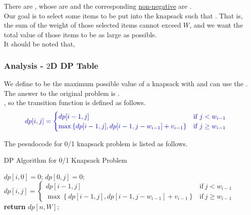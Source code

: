 There are {\color{blue}{$n$ items}}, whose {\color{blue}{weights}} are {} and the corresponding \ul{non-negative} {\color{blue}{values}} are {}. \\

Our goal is to select some items to be put into the knapsack such that {\color{blue}{the total value of those items is maximized}}. That is, the sum of the weight of those selected items cannot exceed $W$, and we want the total value of those items to be as large as possible.\\

It should be noted that, {\color{blue}{in the 0/1 knapsack problem, each item can only be used once.}}

\subsubsection{Analysis - $2$D DP Table}
We define {\color{blue}{$ dp[i, j] $}} to be the maximum possible value of a knapsack with {\color{blue}{capacity $ j $}} and can use the {\color{blue}{first $ i $ items}}. \\

The answer to the original problem is {\color{blue}{$ dp[n, W] $}}.\\

{\color{ForestGreen}{For each item $i$, we can choose to either put it into the knapsack or not}}, so the transition function is defined as follows.
\begin{equation}
{\color{blue}{
dp[i, j] = 
\begin{cases} 
    dp[i - 1, j] & \text{if}\ j < w_{i-1}\\
    \max\left\{dp[i - 1, j], dp[i - 1, j - w_{i-1}] + v_{i-1}\right\} & \text{if}\ j \geq w_{i-1}
\end{cases}
}}
\end{equation}

The pesudocode for 0/1 knapsack problem is listed as follows.
\begin{algorithm}[H]\label{algorithm:01_knapsack_problem_1}
\caption{DP Algorithm for 0/1 Knapsack Problem}
\begin{algorithmic}[1]
 
    \State $dp[i, 0] = 0$;
\EndFor
{}  
    \State $dp[0, j] = 0$;
\EndFor
{}
        \State 
        $dp[i, j] = 
        \begin{cases} 
            dp[i - 1, j] & \text{if}\ j < w_{i-1}\\
            \max\left\{dp[i - 1, j], dp[i - 1, j - w_{i-1}] + v_{i-1}\right\} & \text{if}\ j \geq w_{i-1}
        \end{cases}$
    \EndFor
\EndFor
\State \textbf{return} $dp[n, W]$;
\end{algorithmic}
\end{algorithm}

